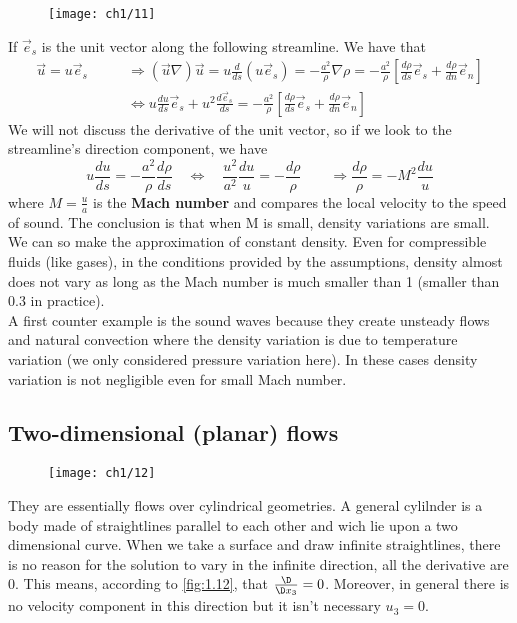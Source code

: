 		\begin{wrapfigure}[4]{l}{2cm}
		\vspace{-5mm}
		\texttt{[image: ch1/11]}
		\end{wrapfigure}
		If $\vec{e}_s$ is the unit vector along the following streamline. We have that 
		\begin{equation}
		\begin{aligned}
			\vec{u}= u \vec{e}_s 
			\qquad &\Rightarrow (\vec{u}\nabla)\vec{u} = u \frac{d}{ds}(u\vec{e}_s) = -\frac{a^2}{\rho} \nabla \rho = -\frac{a^2}{\rho}\left[ \frac{d\rho}{ds}\vec{e}_s + \frac{d\rho}{dn} \vec{e}_n \right]\\
			&\Leftrightarrow u\frac{du}{ds}\vec{e}_s + u^2\frac{d\vec{e}_s}{ds} =  -\frac{a^2}{\rho}\left[ \frac{d\rho}{ds}\vec{e}_s + \frac{d\rho}{dn} \vec{e}_n \right]
			\end{aligned}
		\end{equation}
		We will not discuss the derivative of the unit vector, so if we look to the streamline's direction component, we have
		\begin{equation}
			u\frac{du}{ds} = -\frac{a^2}{\rho} \frac{d\rho}{ds} \quad \Leftrightarrow \quad \frac{u^2}{a^2}\frac{du}{u} = - \frac{d\rho}{\rho} \qquad \Rightarrow \frac{d\rho}{\rho} = -M^2 \frac{du}{u}
		\end{equation}
		where $M = \frac{u}{a}$ is the \textbf{Mach number} and compares the local velocity to the speed of sound. The conclusion is that when M is small, density variations are small. We can so make the approximation of constant density. Even for compressible fluids (like gases), in the conditions provided by the assumptions, density almost does not vary as long as the Mach number is much smaller than 1 (smaller than 0.3 in practice). \\
		A first counter example is the sound waves because they create unsteady flows and natural convection where the density variation is due to temperature variation (we only considered pressure variation here). In these cases density variation is not negligible even for small Mach number. 
		
	\subsection{Two-dimensional (planar) flows}
	
		\begin{wrapfigure}[7]{r}{2.8cm}
		\vspace{-5mm}
		\texttt{[image: ch1/12]}
		\label{fig:1.12}
		\end{wrapfigure}
		They are essentially flows over cylindrical geometries. A general cylilnder is a body made of straightlines parallel to each other and wich lie upon a two dimensional curve. When we take a surface and draw infinite straightlines, there is no reason for the solution to vary in the infinite direction, all the derivative are 0. This means, according to \autoref{fig:1.12}, that $\frac{\D}{\D x_3}=0$. Moreover, in general there is no velocity component in this direction but it isn't necessary $u_3 = 0$.\\
		
